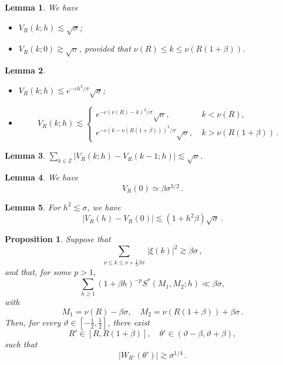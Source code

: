 \documentclass[10pt,a4paper]{amsart}
\newtheorem{lemma}{Lemma}
\newtheorem{proposition}{Proposition}
\newcommand{\bZ}{\mathbb Z}
\begin{document}
\begin{lemma}\label{Lemma5C}
We have
\begin{itemize}
\item[{\rm (i)}] $V_R(k; h)\lesssim \sqrt{\sigma}$;
\item[{\rm (ii)}] $V_R(k; 0) \gtrsim \sqrt{\sigma}$,
provided that  $\nu(R)\le k \le \nu(R(1+\beta))$.
\end{itemize}
\end{lemma}

\begin{lemma}\label{Lemma5B}\mbox{}
\begin{itemize}
\item[{\rm (i)}] $V_R(k; h) \lesssim e^{-ch^2/\sigma}\sqrt{\sigma}$;
\item[{\rm (ii)}]
\[
V_R(k; h) \lesssim
\begin{cases}
e^{-c(\nu(R)-k)^2/\sigma}\sqrt{\sigma}, \ &k<\nu(R), \\
e^{-c(k-\nu(R(1+\beta)))^2/\sigma}\sqrt{\sigma}, \ &k>\nu(R(1+\beta))\,.
\end{cases}
\]
\end{itemize}
\end{lemma}

\begin{lemma}\label{Lemma5D}
$ \displaystyle \sum_{k\in\bZ}
|V_R(k; h) - V_R(k-1; h)| \lesssim \sqrt{\sigma} $.
\end{lemma}

\begin{lemma}\label{Lemma10a} We have
\[
V_R(0) \simeq \beta \sigma^{3/2}\,.
\]
\end{lemma}

\begin{lemma}\label{Lemma10b} For $ h^2 \lesssim \sigma $, we have
\[
|V_R(h) - V_R(0)| \lesssim (1+ h^2\beta)\sqrt{\sigma}\,.
\]
\end{lemma}

\begin{proposition}\label{Lemma5}
Suppose that
\begin{equation}
\label{eq:condition1}
\sum_{\nu \le k \le \nu+\frac12 \beta\sigma}\, |\xi(k)|^2 \gtrsim \beta\sigma\,,
\end{equation}
and that, for some $p>1$,
\begin{equation}
\label{eq:condition2}
\sum_{h \ge 1} (1+\beta h)^{-p} S^*(M_1, M_2; h) \ll \beta\sigma,
\end{equation}
with
\[
M_1 = \nu (R) - \beta\sigma, \quad M_2 =  \nu(R(1+\beta)) + \beta\sigma\,.
\]
Then, for every $\vartheta\in [-\frac12, \frac12]$, there exist
\[
R'\in [R, R(1+\beta)], \quad \theta'\in (\vartheta-\beta, \vartheta+\beta),
\]
such that
\[
|W_{R'}(\theta')| \gtrsim \sigma^{1/4}\,.
\]
\end{proposition}
\end{document}
